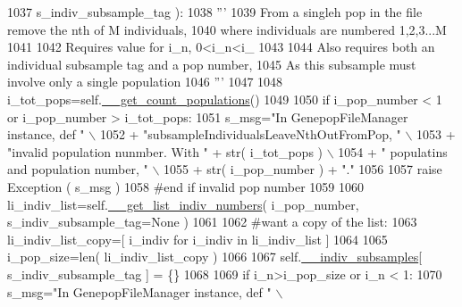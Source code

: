 \begin{DoxyCode}
1037                                                     s\_indiv\_subsample\_tag ):
1038         \textcolor{stringliteral}{'''}
1039 \textcolor{stringliteral}{        From a singleh pop in the file remove the nth of M individuals, }
1040 \textcolor{stringliteral}{        where individuals are numbered 1,2,3...M}
1041 \textcolor{stringliteral}{}
1042 \textcolor{stringliteral}{        Requires value for i\_n, 0<i\_n<i\_}
1043 \textcolor{stringliteral}{}
1044 \textcolor{stringliteral}{        Also requires both an individual subsample tag and a pop number,}
1045 \textcolor{stringliteral}{        As this subsample must involve only a single population}
1046 \textcolor{stringliteral}{        '''}
1047     
1048         i\_tot\_pops=self.\hyperlink{classnegui_1_1genepopfilemanager_1_1GenepopFileManager_a51f6dcbd17c80f8e61114b11283b655f}{\_\_get\_count\_populations}()
1049 
1050         \textcolor{keywordflow}{if} i\_pop\_number < 1 \textcolor{keywordflow}{or} i\_pop\_number > i\_tot\_pops:
1051             s\_msg=\textcolor{stringliteral}{"In GenepopFileManager instance, def "} \(\backslash\)
1052                     + \textcolor{stringliteral}{"subsampleIndividualsLeaveNthOutFromPop, "} \(\backslash\)
1053                     + \textcolor{stringliteral}{"invalid population nunmber.  With "} + str( i\_tot\_pops ) \(\backslash\)
1054                     + \textcolor{stringliteral}{" populatins and  population number, "} \(\backslash\)
1055                     + str( i\_pop\_number ) + \textcolor{stringliteral}{"."}
1056 
1057             \textcolor{keywordflow}{raise} Exception ( s\_msg )
1058         \textcolor{comment}{#end if invalid pop number}
1059 
1060         li\_indiv\_list=self.\hyperlink{classnegui_1_1genepopfilemanager_1_1GenepopFileManager_a4615769e9db90aa477aa3fd865408f54}{\_\_get\_list\_indiv\_numbers}( i\_pop\_number, 
      s\_indiv\_subsample\_tag=\textcolor{keywordtype}{None} )
1061 
1062         \textcolor{comment}{#want a copy of the list:}
1063         li\_indiv\_list\_copy=[ i\_indiv \textcolor{keywordflow}{for} i\_indiv \textcolor{keywordflow}{in} li\_indiv\_list ]
1064 
1065         i\_pop\_size=len( li\_indiv\_list\_copy )
1066 
1067         self.\hyperlink{classnegui_1_1genepopfilemanager_1_1GenepopFileManager_a1e8379bcee4902ca9314ff53fcb71644}{\_\_indiv\_subsamples}[ s\_indiv\_subsample\_tag ] = \{\}
1068 
1069         \textcolor{keywordflow}{if} i\_n>i\_pop\_size \textcolor{keywordflow}{or} i\_n < 1:
1070             s\_msg=\textcolor{stringliteral}{"In GenepopFileManager instance, def "} \(\backslash\)

\end{DoxyCode}
